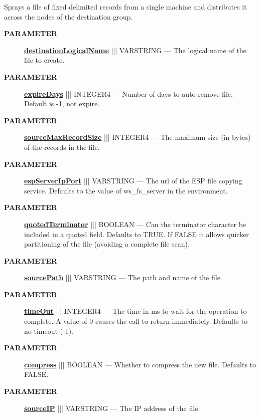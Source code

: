 \par





Sprays a file of fixed delimited records from a single machine and distributes it across the nodes of the destination group.






\par
\begin{description}
\item [\colorbox{tagtype}{\color{white} \textbf{\textsf{PARAMETER}}}] \textbf{\underline{destinationLogicalName}} ||| VARSTRING --- The logical name of the file to create.
\item [\colorbox{tagtype}{\color{white} \textbf{\textsf{PARAMETER}}}] \textbf{\underline{expireDays}} ||| INTEGER4 --- Number of days to auto-remove file. Default is -1, not expire.
\item [\colorbox{tagtype}{\color{white} \textbf{\textsf{PARAMETER}}}] \textbf{\underline{sourceMaxRecordSize}} ||| INTEGER4 --- The maximum size (in bytes) of the records in the file.
\item [\colorbox{tagtype}{\color{white} \textbf{\textsf{PARAMETER}}}] \textbf{\underline{espServerIpPort}} ||| VARSTRING --- The url of the ESP file copying service. Defaults to the value of ws\_fs\_server in the environment.
\item [\colorbox{tagtype}{\color{white} \textbf{\textsf{PARAMETER}}}] \textbf{\underline{quotedTerminator}} ||| BOOLEAN --- Can the terminator character be included in a quoted field. Defaults to TRUE. If FALSE it allows quicker partitioning of the file (avoiding a complete file scan).
\item [\colorbox{tagtype}{\color{white} \textbf{\textsf{PARAMETER}}}] \textbf{\underline{sourcePath}} ||| VARSTRING --- The path and name of the file.
\item [\colorbox{tagtype}{\color{white} \textbf{\textsf{PARAMETER}}}] \textbf{\underline{timeOut}} ||| INTEGER4 --- The time in ms to wait for the operation to complete. A value of 0 causes the call to return immediately. Defaults to no timeout (-1).
\item [\colorbox{tagtype}{\color{white} \textbf{\textsf{PARAMETER}}}] \textbf{\underline{compress}} ||| BOOLEAN --- Whether to compress the new file. Defaults to FALSE.
\item [\colorbox{tagtype}{\color{white} \textbf{\textsf{PARAMETER}}}] \textbf{\underline{sourceIP}} ||| VARSTRING --- The IP address of the file.

\end{description}
